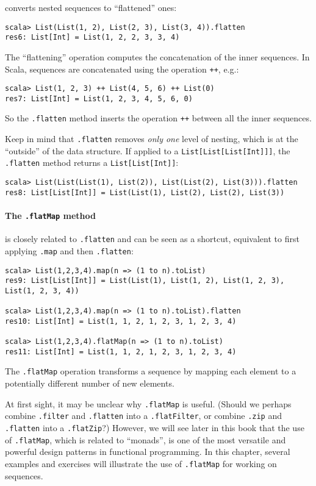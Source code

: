 converts nested sequences to ``flattened'' ones:
\begin{lstlisting}
scala> List(List(1, 2), List(2, 3), List(3, 4)).flatten
res6: List[Int] = List(1, 2, 2, 3, 3, 4)
\end{lstlisting}
The ``flattening'' operation computes the concatenation of the inner
sequences. In Scala, sequences are concatenated using the operation
\lstinline!++!, e.g.:
\begin{lstlisting}
scala> List(1, 2, 3) ++ List(4, 5, 6) ++ List(0)
res7: List[Int] = List(1, 2, 3, 4, 5, 6, 0)
\end{lstlisting}
So the \lstinline!.flatten! method inserts the operation \lstinline!++!
between all the inner sequences.

Keep in mind that \lstinline!.flatten! removes \emph{only one} level
of nesting, which is at the ``outside'' of the data structure. If
applied to a \lstinline!List[List[List[Int]]]!, the \lstinline!.flatten!
method returns a \lstinline!List[List[Int]]!:
\begin{lstlisting}
scala> List(List(List(1), List(2)), List(List(2), List(3))).flatten
res8: List[List[Int]] = List(List(1), List(2), List(2), List(3))
\end{lstlisting}


\paragraph*{The \lstinline!.flatMap! method}

is closely related to \lstinline!.flatten! and can be seen as a shortcut,
equivalent to first applying \lstinline!.map! and then \lstinline!.flatten!:
\begin{lstlisting}
scala> List(1,2,3,4).map(n => (1 to n).toList)
res9: List[List[Int]] = List(List(1), List(1, 2), List(1, 2, 3), List(1, 2, 3, 4))

scala> List(1,2,3,4).map(n => (1 to n).toList).flatten
res10: List[Int] = List(1, 1, 2, 1, 2, 3, 1, 2, 3, 4)

scala> List(1,2,3,4).flatMap(n => (1 to n).toList)
res11: List[Int] = List(1, 1, 2, 1, 2, 3, 1, 2, 3, 4)
\end{lstlisting}
The \lstinline!.flatMap! operation transforms a sequence by mapping
each element to a potentially different number of new elements.

At first sight, it may be unclear why \lstinline!.flatMap! is useful.
(Should we perhaps combine \lstinline!.filter! and \lstinline!.flatten!
into a \lstinline!.flatFilter!, or combine \lstinline!.zip! and
\lstinline!.flatten! into a \lstinline!.flatZip!?) However, we will
see later in this book that the use of \lstinline!.flatMap!, which
is related to ``monads'', is one of the most versatile
and powerful design patterns in functional programming. In this chapter,
several examples and exercises will illustrate the use of \lstinline!.flatMap!
for working on sequences.

